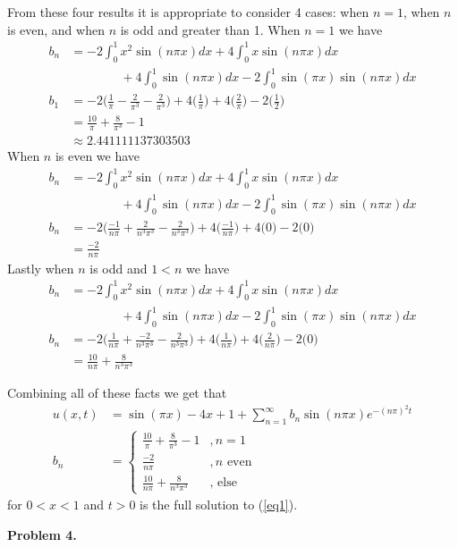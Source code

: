 \documentclass[12pt]{article}
\newcommand{\problem}[1]{\hspace{-4 ex} \large \textbf{Problem #1} }
\begin{document}
From these four results it is appropriate to consider 4 cases: when $n=1$, when $n$ is even, and when $n$ is odd and greater than 1. When $n = 1$ we have
\begin{align*}
	b_n & = -2\int_{0}^{1}x^2 \sin(n \pi x) dx + 4 \int_{0}^{1}x \sin(n \pi x) dx \\
	& \phantom{===} + 4 \int_{0}^{1} \sin(n \pi x) dx - 2\int_{0}^{1} \sin(\pi x)\sin(n \pi x) dx \\
	b_1 & = -2 \bigg( \frac{1}{\pi} - \frac{2}{\pi^3} - \frac{2}{\pi^3}\bigg) + 4 \bigg( \frac{1}{\pi} \bigg) + 4 \bigg( \frac{2}{\pi} \bigg) - 2 \bigg( \frac{1}{2} \bigg) \\
	& = \frac{10}{\pi} + \frac{8}{\pi^3} - 1 \\
	& \approx 2.441111137303503
\end{align*}
When $n$ is even we have
\begin{align*}
b_n & = -2\int_{0}^{1}x^2 \sin(n \pi x) dx + 4 \int_{0}^{1}x \sin(n \pi x) dx \\
& \phantom{===} + 4 \int_{0}^{1} \sin(n \pi x) dx - 2\int_{0}^{1} \sin(\pi x)\sin(n \pi x) dx \\
b_n & = -2 \bigg( \frac{-1}{n\pi} + \frac{2}{n^3\pi^3} - \frac{2}{n^3\pi^3}\bigg) + 4 \bigg( \frac{-1}{n\pi} \bigg) + 4 \bigg( 0 \bigg) - 2 \bigg( 0 \bigg) \\
& = \frac{-2}{n\pi}
\end{align*}
Lastly when $n$ is odd and $1<n$ we have
\begin{align*}
b_n & = -2\int_{0}^{1}x^2 \sin(n \pi x) dx + 4 \int_{0}^{1}x \sin(n \pi x) dx \\
& \phantom{===} + 4 \int_{0}^{1} \sin(n \pi x) dx - 2\int_{0}^{1} \sin(\pi x)\sin(n \pi x) dx \\
b_n & = -2 \bigg( \frac{1}{n\pi} + \frac{-2}{n^3\pi^3} - \frac{2}{n^3\pi^3}\bigg) + 4 \bigg( \frac{1}{n\pi} \bigg) + 4 \bigg( \frac{2}{n\pi} \bigg) - 2 \bigg( 0 \bigg) \\
& = \frac{10}{n\pi} + \frac{8}{n^3 \pi^3}
\end{align*}

Combining all of these facts we get that 
\begin{align*}
	u(x,t) & = \sin(\pi x) - 4x + 1 + \sum\limits_{n=1}^\infty b_n \sin(n \pi x)e^{-(n \pi)^2t} \\
	b_n & = \begin{cases}
			\frac{10}{\pi} + \frac{8}{\pi^3} - 1 &, n=1 \\
			\frac{-2}{n\pi} & , n \text{ even} \\
			\frac{10}{n\pi} + \frac{8}{n^3 \pi^3} & \text{, else}
		\end{cases}
\end{align*}
for $0<x<1$ and $t>0$ is the full solution to (\ref{eq1}).

\problem{4. }
\end{document}
